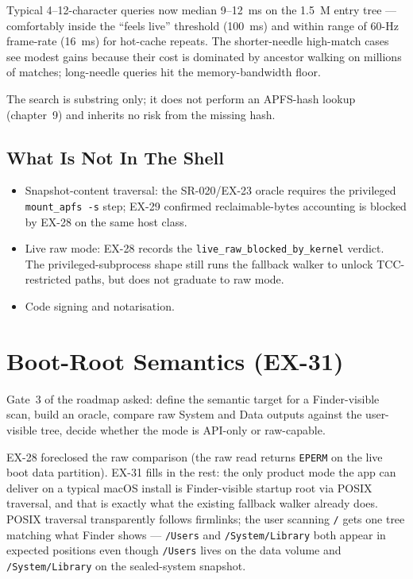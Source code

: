 Typical 4--12-character queries now median 9--12~ms on the 1.5~M
entry tree --- comfortably inside the ``feels live'' threshold
(100~ms) and within range of 60-Hz frame-rate (16~ms) for
hot-cache repeats. The shorter-needle high-match cases see modest
gains because their cost is dominated by ancestor walking
on millions of matches; long-needle queries hit the
memory-bandwidth floor.

The search is substring only; it does not perform an APFS-hash
lookup (chapter~9) and inherits no risk from the missing hash.

\subsection{What Is Not In The Shell}

\begin{itemize}
  \item Snapshot-content traversal: the SR-020/EX-23 oracle
    requires the privileged \texttt{mount\_apfs -s} step; EX-29
    confirmed reclaimable-bytes accounting is blocked by EX-28
    on the same host class.
  \item Live raw mode: EX-28 records the
    \texttt{live\_raw\_blocked\_by\_kernel} verdict. The
    privileged-subprocess shape still runs the fallback walker
    to unlock TCC-restricted paths, but does not graduate to
    raw mode.
  \item Code signing and notarisation.
\end{itemize}

\section{Boot-Root Semantics (EX-31)}

Gate~3 of the roadmap asked: define the semantic target for a
Finder-visible scan, build an oracle, compare raw System and Data
outputs against the user-visible tree, decide whether the mode is
API-only or raw-capable.

EX-28 foreclosed the raw comparison (the raw read returns
\texttt{EPERM} on the live boot data partition). EX-31 fills in
the rest: the only product mode the app can deliver on a typical
macOS install is Finder-visible startup root via POSIX traversal,
and that is exactly what the existing fallback walker already
does. POSIX traversal transparently follows firmlinks; the user
scanning \texttt{/} gets one tree matching what Finder shows ---
\texttt{/Users} and \texttt{/System/Library} both appear in
expected positions even though \texttt{/Users} lives on the data
volume and \texttt{/System/Library} on the sealed-system
snapshot.

